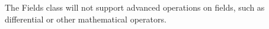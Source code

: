 


The Fields class will not support advanced
operations on fields, such as differential or other
mathematical operators.



